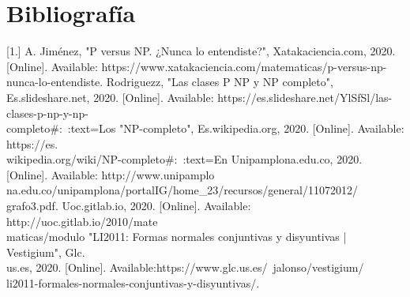 \documentclass[12pt,twoside]{article}
\begin{document}
\section{Bibliograf\'ia}
[1.] A. Jiménez, "P versus NP. ¿Nunca lo entendiste?", Xatakaciencia.com, 2020. [Online]. Available: https://www.xatakaciencia.com/matematicas/p-versus-np-nunca-lo-entendiste.
\newline\newline
[2.] Rodriguezz, "Las clases P NP y NP completo", Es.slideshare.net, 2020. [Online]. Available: https://es.slideshare.net/YlSfSl/las-clases-p-np-y-np-\\completo#:~:text=Los%
\newline\newline
[3.] "NP-completo", Es.wikipedia.org, 2020. [Online]. Available: https://es.\\wikipedia.org/wiki/NP-completo#:~:text=En%
\newline\newline
[4.] Unipamplona.edu.co, 2020. [Online]. Available: http://www.unipamplo\\na.edu.co/unipamplona/portalIG/home_23/recursos/general/11072012/\\grafo3.pdf. \newline\newline
[5.] Uoc.gitlab.io, 2020. [Online]. Available: http://uoc.gitlab.io/2010/mate\\maticas/modulo%
\newline\newline
[6.] "LI2011: Formas normales conjuntivas y disyuntivas | Vestigium", Glc.\\us.es, 2020. [Online]. Available:https://www.glc.us.es/~jalonso/vestigium/\\li2011-formales-normales-conjuntivas-y-disyuntivas/.
\end{document}
